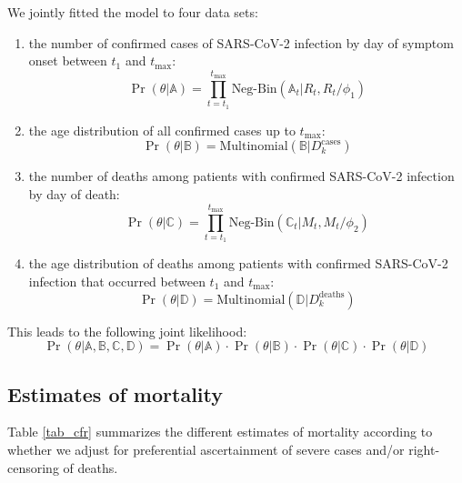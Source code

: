 \documentclass{article}
\begin{document}
We jointly fitted the model to four data sets: 
	\begin{enumerate}
		\item the number of confirmed cases of  SARS-CoV-2 infection by day of symptom onset between $t_1$ and $t_{\text{max}}$:
		\begin{equation}
		\Pr(\theta| \mathds{A}) =  \prod_{t=t_1}^{t_{\text{max}}} \text{Neg-Bin}(\mathds{A}_t| R_t,R_t/\phi_1)
		\end{equation}
		
		\item the age distribution of all confirmed cases up to $t_{\text{max}}$: 
		\begin{equation}
		\Pr(\theta| \mathds{B}) = \text{Multinomial}(\mathds{B}|D_k^{\text{cases}})
		\end{equation}
		
		\item the number of deaths among patients with confirmed SARS-CoV-2 infection by day of death:
		\begin{equation}
		\Pr(\theta| \mathds{C}) =  \prod_{t=t_1}^{t_{\text{max}}} \text{Neg-Bin}(\mathds{C}_t|M_t,M_t/\phi_2)
		\end{equation}
		
		\item the age distribution of deaths among patients with confirmed SARS-CoV-2 infection that occurred between $t_1$ and $t_{\text{max}}$:
		\begin{equation}
		\Pr(\theta| \mathds{D}) = \text{Multinomial}(\mathds{D}|D_k^{\text{deaths}})
		\end{equation}
	\end{enumerate}
	This leads to the following joint likelihood:
	\begin{equation}
	\Pr(\theta | \mathds{A},\mathds{B},\mathds{C},\mathds{D}) = \Pr(\theta| \mathds{A}) \cdot \Pr(\theta| \mathds{B}) \cdot \Pr(\theta| \mathds{C}) \cdot \Pr(\theta| \mathds{D})
	\end{equation}
	
\subsection{Estimates of mortality}
Table \ref{tab_cfr} summarizes the different estimates of mortality according to whether we adjust for preferential ascertainment of severe cases and/or right-censoring of deaths.
\end{document}
